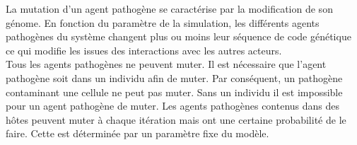 La mutation d'un agent pathogène se caractérise par la modification de son génome. En fonction du paramètre de la simulation, les différents agents pathogènes du système changent plus ou moins leur séquence de code génétique ce qui modifie les issues des interactions avec les autres acteurs.\\

Tous les agents pathogènes ne peuvent muter. Il est nécessaire que l'agent pathogène soit dans un individu afin de muter. Par conséquent, un pathogène contaminant une cellule ne peut pas muter. Sans un individu il est impossible pour un agent pathogène de muter. Les agents pathogènes contenus dans des hôtes peuvent muter à chaque itération mais ont une certaine probabilité de le faire. Cette est déterminée par un paramètre fixe du modèle.